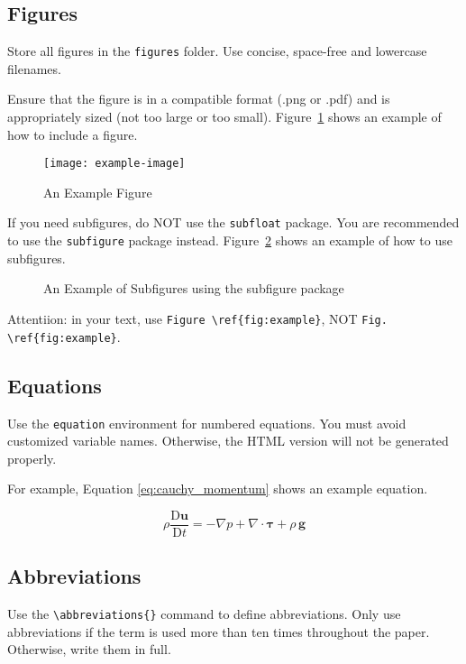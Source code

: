 \documentclass[
  manuscript=article,  %
  layout=preprint,  %
  year=20xx,
  volume=x,
]{extra/joas}
\begin{document}
\subsection{Figures}
Store all figures in the \texttt{figures} folder. Use concise, space-free and lowercase filenames.

Ensure that the figure is in a compatible format (.png or .pdf) and is appropriately sized (not too large or too small). Figure~\ref{fig:example} shows an example of how to include a figure. 

\begin{figure}[htbp!]
  \centering
  \texttt{[image: example-image]}
  \caption{An Example Figure}
  \label{fig:example}
\end{figure}

If you need subfigures, do NOT use the \texttt{subfloat} package. You are recommended to use the \texttt{subfigure} package instead. Figure~\ref{fig:subfig_example} shows an example of how to use subfigures.

\begin{figure}[htbp!]
  \centering
  \hspace{0.2cm}
  \caption{An Example of Subfigures using the subfigure package}
  \label{fig:subfig_example}
\end{figure}

Attentiion: in your text, use \verb|Figure \ref{fig:example}|, NOT \verb|Fig. \ref{fig:example}|.


\subsection{Equations}
Use the \verb|equation| environment for numbered equations. You must avoid customized variable names. Otherwise, the HTML version will not be generated properly.

For example, Equation \ref{eq:cauchy_momentum} shows an example equation.

\begin{equation} \label{eq:cauchy_momentum}
\rho\frac{\mathrm{D} \mathbf{u}}{\mathrm{D} t} = - \nabla p + \nabla \cdot \boldsymbol \tau + \rho\,\mathbf{g}
\end{equation}

\subsection{Abbreviations}
Use the \verb|\abbreviations{}| command to define abbreviations. Only use abbreviations if the term is used more than ten times throughout the paper. Otherwise, write them in full.
\end{document}
